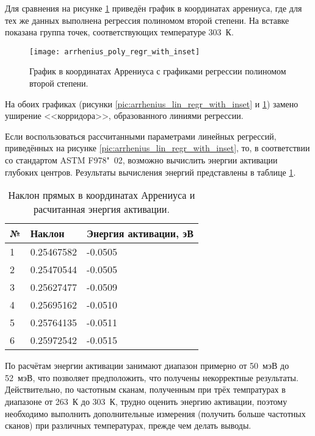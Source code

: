 	Для сравнения на рисунке \ref{pic:arrhenius_poly_regr_with_inset} приведён
	график в координатах аррениуса, где для тех же данных выполнена регрессия
	полиномом второй степени. На вставке показана группа точек, соответствующих 
	температуре 303~К.

	\begin{figure}[!htp]
		\centering
		\texttt{[image: arrhenius\_poly\_regr\_with\_inset]}
		\caption{График в координатах Аррениуса с графиками регрессии
		         полиномом второй степени.}
		\label{pic:arrhenius_poly_regr_with_inset}
	\end{figure}

	На обоих графиках (рисунки \ref{pic:arrhenius_lin_regr_with_inset} и 
	\ref{pic:arrhenius_poly_regr_with_inset}) замено уширение <<корридора>>,
	образованного линиями регрессии.

	Если воспользоваться рассчитанными параметрами линейных регрессий, 
	приведённых на рисунке \ref{pic:arrhenius_lin_regr_with_inset}, то,
	в соответствии со стандартом ASTM F978"~02, возможно вычислить энергии
	активации глубоких центров. Результаты вычисления энергий представлены в
	таблице \ref{table:6_exp_energy}.

	\begin{table}[!htp]
		\centering
		\caption{Наклон прямых в координатах Аррениуса 
		         и расчитанная энергия активации.}
		\begin{tabular}{|l|l|l|}
		\hline
			№ & Наклон     & Энергия активации, эВ \\ \hline
			1 & 0.25467582 & -0.0505               \\ \hline
			2 & 0.25470544 & -0.0505               \\ \hline
			3 & 0.25627477 & -0.0509               \\ \hline
			4 & 0.25695162 & -0.0510               \\ \hline
			5 & 0.25764135 & -0.0511               \\ \hline
			6 & 0.25972542 & -0.0515               \\ \hline
		\end{tabular}
		\label{table:6_exp_energy}
	\end{table}

	По расчётам энергии активации занимают диапазон примерно от 50~мэВ до 52~мэВ,
	что позволяет предположить, что получены некорректные результаты. Действительно,
	по частотным сканам, полученным при трёх темпратурах в диапазоне от 263~К до
	303~К, трудно оценить энергию активации, поэтому необходимо выполнить
	дополнительные измерения (получить больше частотных сканов) при различных
	температурах, прежде чем делать выводы.